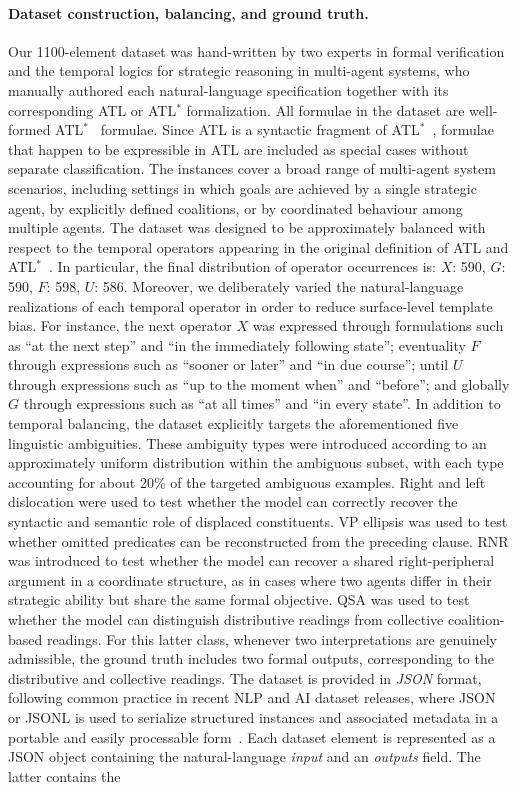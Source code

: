 \paragraph{Dataset construction, balancing, and ground truth.}
Our 1100-element dataset was hand-written by two experts in formal verification and the temporal logics for strategic reasoning in multi-agent systems, who manually authored each natural-language specification together with its corresponding ATL or ATL$^\ast$ formalization. All formulae in the dataset are well-formed ATL$^\ast$~ formulae. Since ATL is a syntactic fragment of ATL$^\ast$~, formulae that happen to be expressible in ATL are included as special cases without separate classification. The instances cover a broad range of multi-agent system scenarios, including settings in which goals are achieved by a single strategic agent, by explicitly defined coalitions, or by coordinated behaviour among multiple agents. The dataset was designed to be approximately balanced with respect to the temporal operators appearing in the original definition of ATL and ATL$^\ast$~\cite{alur2002alternating}. In particular, the final distribution of operator occurrences is: $X$: 590, $G$: 590, $F$: 598, $U$: 586. Moreover, we deliberately varied the natural-language realizations of each temporal operator in order to reduce surface-level template bias. For instance, the next operator $X$ was expressed through formulations such as ``at the next step'' and ``in the immediately following state''; eventuality $F$ through expressions such as ``sooner or later'' and ``in due course''; until $U$ through expressions such as ``up to the moment when'' and ``before''; and globally $G$ through expressions such as ``at all times'' and ``in every state''. In addition to temporal balancing, the dataset explicitly targets the aforementioned five linguistic ambiguities. These ambiguity types were introduced according to an approximately uniform distribution within the ambiguous subset, with each type accounting for about 20\% of the targeted ambiguous examples. Right and left dislocation were used to test whether the model can correctly recover the syntactic and semantic role of displaced constituents. VP ellipsis was used to test whether omitted predicates can be reconstructed from the preceding clause. RNR was introduced to test whether the model can recover a shared right-peripheral argument in a coordinate structure, as in cases where two agents differ in their strategic ability but share the same formal objective. QSA was used to test whether the model can distinguish distributive readings from collective coalition-based readings. For this latter class, whenever two interpretations are genuinely admissible, the ground truth includes two formal outputs, corresponding to the distributive and collective readings. The dataset is provided in \textit{JSON} format, following common practice in recent NLP and AI dataset releases, where JSON or JSONL is used to serialize structured instances and associated metadata in a portable and easily processable form~\cite{wang2025verifiable}. Each dataset element is represented as a JSON object containing the natural-language \textit{input} and an \textit{outputs} field. The latter contains the 